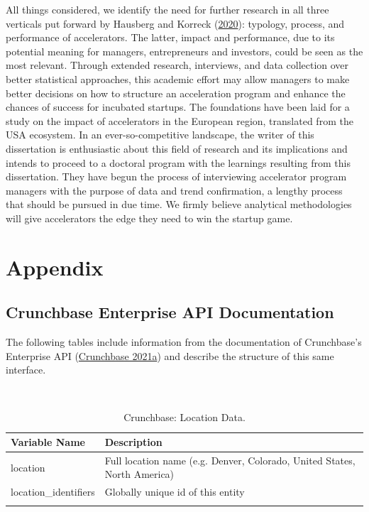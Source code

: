 \documentclass[
  12pt,
]{article}
\begin{document}
All things considered, we identify the need for further research in all three verticals put forward by Hausberg and Korreck (\protect\hyperlink{ref-hausberg_business_2020}{2020}): typology, process, and performance of accelerators. The latter, impact and performance, due to its potential meaning for managers, entrepreneurs and investors, could be seen as the most relevant. Through extended research, interviews, and data collection over better statistical approaches, this academic effort may allow managers to make better decisions on how to structure an acceleration program and enhance the chances of success for incubated startups. The foundations have been laid for a study on the impact of accelerators in the European region, translated from the USA ecosystem. In an ever-so-competitive landscape, the writer of this dissertation is enthusiastic about this field of research and its implications and intends to proceed to a doctoral program with the learnings resulting from this dissertation. They have begun the process of interviewing accelerator program managers with the purpose of data and trend confirmation, a lengthy process that should be pursued in due time. We firmly believe analytical methodologies will give accelerators the edge they need to win the startup game.

\clearpage

\appendix

\hypertarget{appendix}{%
\section{Appendix}\label{appendix}}

\hypertarget{crunchbasedocs}{%
\subsection{Crunchbase Enterprise API Documentation}\label{crunchbasedocs}}

The following tables include information from the documentation of Crunchbase's Enterprise API (\protect\hyperlink{ref-crunchbase_documentation_2021}{Crunchbase 2021a}) and describe the structure of this same interface.

~

\onehalfspacing

\begin{table}[H]

\caption{\label{tab:crunchlocation}Crunchbase: Location Data.}
\centering
\fontsize{9}{11}\selectfont
\begin{tabu} to 
\toprule
Variable Name & Description\\
\midrule
location & Full location name (e.g. Denver, Colorado, United States, North America)\\
\addlinespace
location\_identifiers & Globally unique id of this entity\\
\bottomrule
{}\\
\end{tabu}
\end{table}
\end{document}
